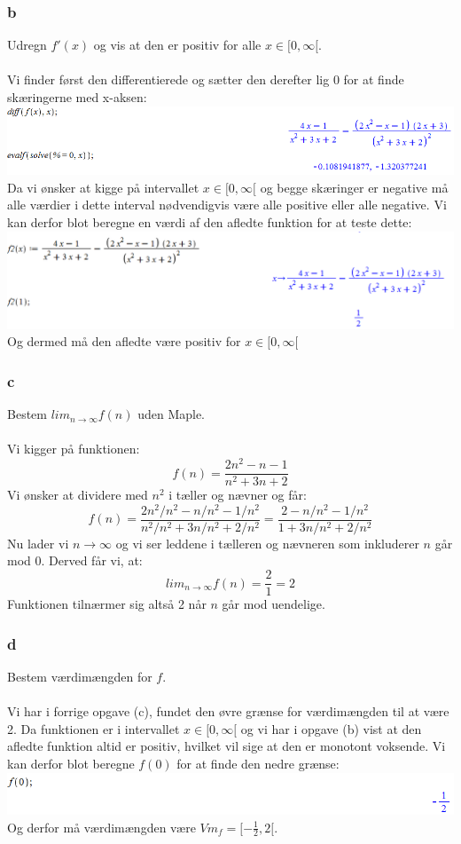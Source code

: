 \documentclass[12pt]{article}
\begin{document}
\subsubsection*{b}
Udregn $f'(x)$ og vis at den er positiv for alle $x\in [0,\infty[$.\\
\\
Vi finder først den differentierede og sætter den derefter lig 0 for at finde skæringerne med x-aksen:\\
\includegraphics[scale=0.6]{Pic3}\\
Da vi ønsker at kigge på intervallet $x\in[0,\infty[$ og begge skæringer er negative må alle værdier i dette interval nødvendigvis være alle positive eller alle negative. Vi kan derfor blot beregne en værdi af den afledte funktion for at teste dette:\\
\includegraphics[scale=0.6]{Pic4}\\
Og dermed må den afledte være positiv for $x\in[0,\infty[$

\subsubsection*{c}
Bestem $lim_{n\rightarrow \infty} f(n)$ uden Maple.\\
\\
Vi kigger på funktionen:
$$f(n)=\frac{2n^2-n-1}{n^2+3n+2}$$
Vi ønsker at dividere med $n^2$ i tæller og nævner og får:
$$f(n)=\frac{2n^2/n^2-n/n^2-1/n^2}{n^2/n^2+3n/n^2+2/n^2}=\frac{2-n/n^2-1/n^2}{1+3n/n^2+2/n^2}$$
Nu lader vi $n\rightarrow \infty$ og vi ser leddene i tælleren og nævneren som inkluderer $n$ går mod 0. Derved får vi, at:
$$lim_{n\rightarrow \infty} f(n)=\frac{2}{1}=2$$
Funktionen tilnærmer sig altså 2 når $n$ går mod uendelige.

\subsubsection*{d}
Bestem værdimængden for $f$.\\
\\
Vi har i forrige opgave (c), fundet den øvre grænse for værdimængden til at være 2. Da funktionen er i intervallet $x\in[0,\infty[$ og vi har i opgave (b) vist at den afledte funktion altid er positiv, hvilket vil sige at den er monotont voksende. Vi kan derfor blot beregne $f(0)$ for at finde den nedre grænse:
\includegraphics[scale=0.6]{Pic5}\\
Og derfor må værdimængden være $Vm_f=[-\frac{1}{2},2[$.
\end{document}
